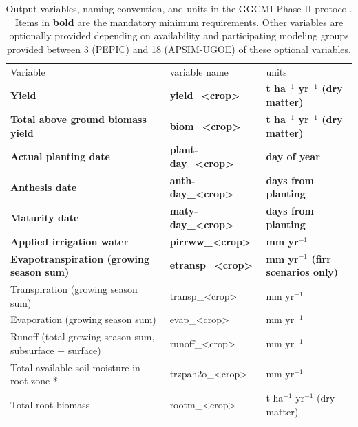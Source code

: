 \documentclass[gmd, manuscript]{copernicus} %
\begin{document}
\begin{table}[]
  \caption{Output variables, naming convention, and units in the GGCMI Phase II protocol. Items in \textbf{bold} are the mandatory minimum requirements. Other variables are optionally provided depending on availability and participating modeling groups provided between 3 (PEPIC) and 18 (APSIM-UGOE) of these optional variables.}
  \label{table:outputs}
  \begin{tabular}{lll}
    \tophline \vspace{1mm}
    Variable                                & variable name             & units \\
    \middlehline \vspace{1mm}
    \textbf{Yield}                                   & \textbf{yield\_<crop>}     & \textbf{t ha$^{-1}$ yr$^{-1}$ (dry matter)}\\
    \textbf{Total above ground biomass yield}        & \textbf{biom\_<crop>}      & \textbf{t ha$^{-1}$ yr$^{-1}$ (dry matter)}\\
    \textbf{Actual planting date}                    & \textbf{plant-day\_<crop>} & \textbf{day of year}\\
    \textbf{Anthesis date}                           & \textbf{anth-day\_<crop>}  & \textbf{days from planting} \\
    \textbf{Maturity date}                           & \textbf{maty-day\_<crop>}  & \textbf{days from planting}\\
    \textbf{Applied irrigation water}                & \textbf{pirrww\_<crop>}    & \textbf{mm yr$^{-1}$} \\
    \textbf{Evapotranspiration (growing season sum)} & \textbf{etransp\_<crop>}   & \textbf{mm yr$^{-1}$ (firr scenarios only)}\\ \middlehline
    Transpiration (growing season sum)                       & transp\_<crop>    & mm yr$^{-1}$ \\
    Evaporation (growing season sum)                         & evap\_<crop>      & mm yr$^{-1}$ \\
    Runoff (total growing season sum, subsurface + surface)  & runoff\_<crop>    & mm yr$^{-1}$                    \\
    Total available soil moisture in root zone *             & trzpah2o\_<crop>  & mm yr$^{-1}$                    \\
    Total root biomass                                       & rootm\_<crop>     & t ha$^{-1}$ yr$^{-1}$ (dry matter)  \\

\end{tabular}
\end{table}
\end{document}
